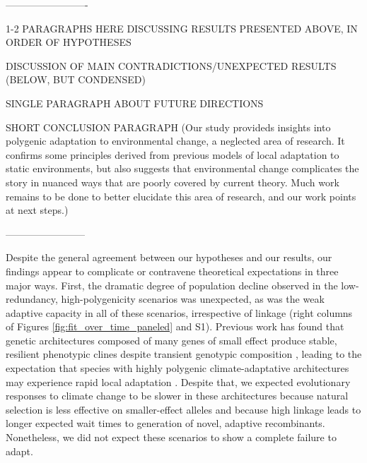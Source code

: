 \documentclass[9pt,twocolumn,twoside,lineno]{pnas-new}
\begin{document}
-------------------------

1-2 PARAGRAPHS HERE DISCUSSING RESULTS PRESENTED ABOVE, IN ORDER OF HYPOTHESES

DISCUSSION OF MAIN CONTRADICTIONS/UNEXPECTED RESULTS (BELOW, BUT CONDENSED)

SINGLE PARAGRAPH ABOUT FUTURE DIRECTIONS

SHORT CONCLUSION PARAGRAPH (Our study provideds insights into polygenic adaptation to environmental change, a neglected area of research. It confirms some principles derived from previous models of local adaptation to static environments, but also suggests that environmental change complicates the story in nuanced ways that are poorly covered by current theory. Much work remains to be done to better elucidate this area of research, and our work points at next steps.)

------------------------

Despite the general agreement between our hypotheses and our results,
our findings appear to complicate or contravene theoretical expectations in three major ways.
First, the dramatic degree of population decline observed in the low-redundancy, high-polygenicity
scenarios was unexpected,
as was the weak adaptive capacity in all of these scenarios, irrespective of 
linkage (right columns of Figures \ref{fig:fit_over_time_paneled} and S1).
Previous work has found that genetic architectures composed
of many genes of small effect produce stable, resilient phenotypic clines despite transient genotypic composition \cite{yeaman_amnat,yeaman_review},
leading to the expectation that species with highly polygenic climate-adaptative architectures 
may experience rapid local adaptation \cite{aitken_yeaman}. 
Despite that, we expected evolutionary responses to climate change
to be slower in these architectures
because natural selection is less effective on smaller-effect alleles
and because high linkage leads to longer expected wait times to generation
of novel, adaptive recombinants.
Nonetheless, we did not expect these scenarios to show a complete failure to adapt.
\end{document}
